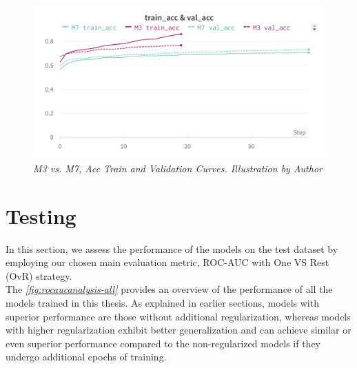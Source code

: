 \newpage

\begin{figure}[H]
  \centering
  \includegraphics[width=\textwidth]{imatges/results/AccM3M7.png}
  \caption[M3 vs. M7, Acc Train and Validation Curves]{\textit{M3 vs. M7, Acc Train and Validation Curves. Illustration by Author}}
\end{figure}


\newpage

\section{Testing}

In this section, we assess the performance of the models on the test dataset by
employing our chosen main evaluation metric, ROC-AUC with One VS Rest (OvR)
strategy. \\

The \textit{\ref{fig:rocaucanalysis-all}} provides an overview of the
performance of all the models trained in this thesis. As explained in earlier
sections, models with superior performance are those without additional
regularization, whereas models with higher regularization exhibit better
generalization and can achieve similar or even superior performance compared to
the non-regularized models if they undergo additional epochs of training.

